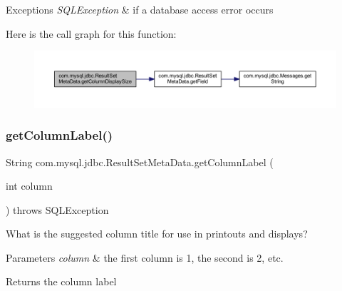 \begin{DoxyExceptions}{Exceptions}
{\em S\+Q\+L\+Exception} & if a database access error occurs \\
\hline
\end{DoxyExceptions}
Here is the call graph for this function\+:
\nopagebreak
\begin{figure}[H]
\begin{center}
\leavevmode
\includegraphics[width=350pt]{classcom_1_1mysql_1_1jdbc_1_1_result_set_meta_data_af69e95164eddfe6ae48d883703133485_cgraph}
\end{center}
\end{figure}
\mbox{\label{classcom_1_1mysql_1_1jdbc_1_1_result_set_meta_data_a7915a4d0be8c46d029d9b4ca1673bbd9}} 
\subsubsection{\texorpdfstring{get\+Column\+Label()}{getColumnLabel()}}
{\footnotesize\ttfamily String com.\+mysql.\+jdbc.\+Result\+Set\+Meta\+Data.\+get\+Column\+Label (\begin{DoxyParamCaption}\item[{int}]{column }\end{DoxyParamCaption}) throws S\+Q\+L\+Exception}

What is the suggested column title for use in printouts and displays?


\begin{DoxyParams}{Parameters}
{\em column} & the first column is 1, the second is 2, etc.\\
\hline
\end{DoxyParams}
\begin{DoxyReturn}{Returns}
the column label
\end{DoxyReturn}

